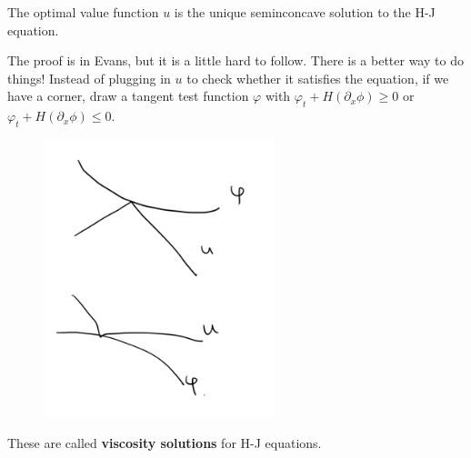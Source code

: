 \begin{theorem}
    The optimal value function $u$ is the unique seminconcave solution to the H-J equation.
\end{theorem}
The proof is in Evans, but it is a little hard to follow. There is a better way to do things! Instead of plugging in $u$ to check whether it satisfies the equation, if we have a corner, draw a tangent test function $\varphi$ with $\varphi_{t}+H\left(\partial_{x} \phi\right) \geq 0$ or $\varphi_{t}+H\left(\partial_{x} \phi\right) \leq 0$.

\begin{figure}[H]
    \centering
    \includegraphics[width=0.6\textwidth]{pics/10-3.png}
\end{figure}

These are called \textbf{viscosity solutions} for H-J equations.

